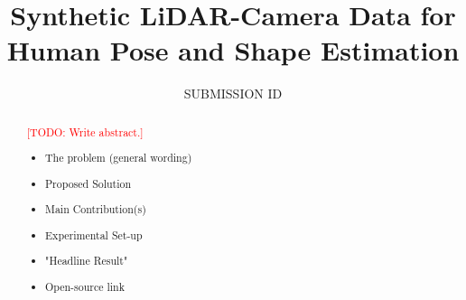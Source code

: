 \documentclass{egpubl}
\title[Synthetic LiDAR-Camera Data for Human Pose and Shape Estimation]%
      {Synthetic LiDAR-Camera Data for Human Pose and Shape Estimation}
\author[SUBMISSION ID]{SUBMISSION ID}
\newcommand{\todo}[1]{\textcolor{red}{[TODO: #1]}}
\begin{document}

\maketitle

\begin{abstract}
\todo{Write abstract.}
\begin{itemize}
  \item The problem (general wording)
  \item Proposed Solution
  \item Main Contribution(s)
  \item Experimental Set-up
  \item "Headline Result"
  \item Open-source link
\end{itemize}

\end{abstract}
\end{document}
